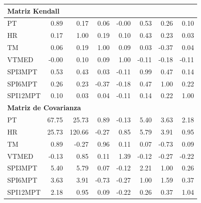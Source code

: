 \begin{table}[ht]
\begin{tabular}{lrrrrrrr}
\midrule
\multicolumn{8}{l}{\textbf{Matriz Kendall}} \\
\midrule
PT       & 0.89 & 0.17 & 0.06 & -0.00 & 0.53 & 0.26 & 0.10 \\
HR       & 0.17 & 1.00 & 0.19 & 0.10 & 0.43 & 0.23 & 0.03 \\
TM       & 0.06 & 0.19 & 1.00 & 0.09 & 0.03 & -0.37 & 0.04 \\
VTMED    & -0.00 & 0.10 & 0.09 & 1.00 & -0.11 & -0.18 & -0.11 \\
SPI3MPT  & 0.53 & 0.43 & 0.03 & -0.11 & 0.99 & 0.47 & 0.14 \\
SPI6MPT  & 0.26 & 0.23 & -0.37 & -0.18 & 0.47 & 1.00 & 0.22 \\
SPI12MPT & 0.10 & 0.03 & 0.04 & -0.11 & 0.14 & 0.22 & 1.00 \\
\midrule
\multicolumn{8}{l}{\textbf{Matriz de Covarianza}} \\
\midrule
PT       & 67.75 & 25.73 & 0.89 & -0.13 & 5.40 & 3.63 & 2.18 \\
HR       & 25.73 & 120.66 & -0.27 & 0.85 & 5.79 & 3.91 & 0.95 \\
TM       & 0.89 & -0.27 & 0.96 & 0.11 & 0.07 & -0.73 & 0.09 \\
VTMED    & -0.13 & 0.85 & 0.11 & 1.39 & -0.12 & -0.27 & -0.22 \\
SPI3MPT  & 5.40 & 5.79 & 0.07 & -0.12 & 2.21 & 1.00 & 0.26 \\
SPI6MPT  & 3.63 & 3.91 & -0.73 & -0.27 & 1.00 & 1.59 & 0.37 \\
SPI12MPT & 2.18 & 0.95 & 0.09 & -0.22 & 0.26 & 0.37 & 1.04 \\
\bottomrule
\end{tabular}
\end{table}




